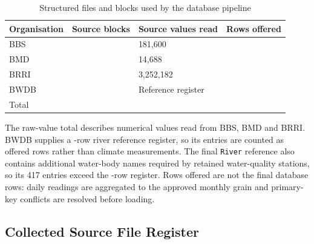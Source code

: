 \begin{table}[H]
\centering
\caption{Structured files and blocks used by the database pipeline}
\label{tab:source-profile}
\renewcommand{\arraystretch}{1.38}
\begin{tabular}{L{0.25\textwidth}C{0.17\textwidth}C{0.24\textwidth}C{0.18\textwidth}}
\toprule
Organisation & Source blocks & Source values read & Rows offered \\
\midrule
BBS & \mBlocksBBS{} & 181,600 & \mOfferedBBS{} \\
BMD & \mBlocksBMD{} & 14,688 & \mOfferedBMD{} \\
BRRI & \mBlocksBRRI{} & 3,252,182 & \mOfferedBRRI{} \\
BWDB & \mBlocksBWDB{} & Reference register & \mOfferedBWDB{} \\
\midrule
Total & \mSourceBlocks{} & \mRawValues{} & \mRowsOffered{} \\
\bottomrule
\end{tabular}
\end{table}

The raw-value total describes numerical values read from BBS, BMD and BRRI.
BWDB supplies a \mOfferedBWDB-row river reference register, so its entries are
counted as offered rows rather than climate measurements. The final
\texttt{River} reference also contains additional water-body names required by
retained water-quality stations, so its 417 entries exceed the
\mOfferedBWDB-row register. Rows offered are not the final database rows: daily
readings are aggregated to the approved monthly grain and primary-key conflicts
are resolved before loading.

\subsection{Collected Source File Register}
\label{subsec:source-file-register}

